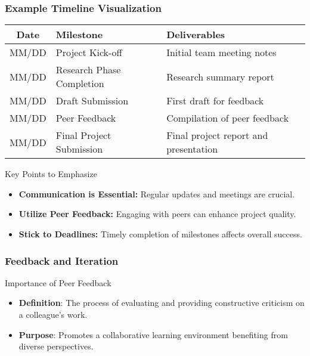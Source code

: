 \documentclass[aspectratio=169]{beamer}
\begin{document}
\begin{frame}[fragile]
    \frametitle{Example Timeline Visualization}

    \begin{center}
        \begin{tabular}{|c|l|l|}
            \hline
            \textbf{Date} & \textbf{Milestone} & \textbf{Deliverables} \\
            \hline
            MM/DD & Project Kick-off & Initial team meeting notes \\
            \hline
            MM/DD & Research Phase Completion & Research summary report \\
            \hline
            MM/DD & Draft Submission & First draft for feedback \\
            \hline
            MM/DD & Peer Feedback & Compilation of peer feedback \\
            \hline
            MM/DD & Final Project Submission & Final project report and presentation \\
            \hline
        \end{tabular}
    \end{center}

    \begin{block}{Key Points to Emphasize}
        \begin{itemize}
            \item \textbf{Communication is Essential:} Regular updates and meetings are crucial.
            \item \textbf{Utilize Peer Feedback:} Engaging with peers can enhance project quality.
            \item \textbf{Stick to Deadlines:} Timely completion of milestones affects overall success.
        \end{itemize}
    \end{block}
\end{frame}

\begin{frame}[fragile]
    \frametitle{Feedback and Iteration}
    \begin{block}{Importance of Peer Feedback}
        \begin{itemize}
            \item \textbf{Definition}: The process of evaluating and providing constructive criticism on a colleague's work.
            \item \textbf{Purpose}: Promotes a collaborative learning environment benefiting from diverse perspectives.
        \end{itemize}
    \end{block}
\end{frame}
\end{document}
